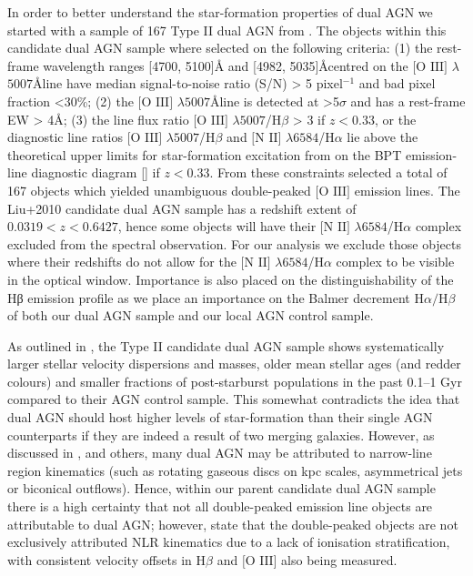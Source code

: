 In order to better understand the star-formation properties of dual AGN we started with a sample of 167 Type II dual AGN from \cite{Liu_2009}. The objects within this candidate dual AGN sample where selected on the following criteria: (1) the rest-frame wavelength ranges [4700, 5100]\AA{} and [4982, 5035]\AA centred on the $\text{[O III]}$ $\lambda$$5007$\AA line have median signal-to-noise ratio (S/N) > 5 pixel$^{−1}$ and bad pixel fraction <30\%; (2) the $\text{[O III]}$ $\lambda$$5007$\AA line is detected at >5$\sigma$ and has a rest-frame EW > 4\AA; (3) the line flux ratio $\text{[O III]}$ $\lambda$$5007$/$\text{H}\beta$ > 3 if ${z}<{0.33}$, or the diagnostic line ratios $\text{[O III]}$ $\lambda$$5007$/$\text{H}\beta$ and $\text{[N II]}$ $\lambda$$6584$/$\text{H}\alpha$ lie above the theoretical upper limits for star-formation excitation from \cite{Kewley_Dopita_Sutherland_Heisler_Trevena_2001} on the BPT emission-line diagnostic diagram [\cite{Baldwin_1981}] if ${z}<{0.33}$. From these constraints \cite{Liu_2009} selected a total of 167 objects which yielded unambiguous double-peaked $\text{[O III]}$ emission lines. The Liu+2010 candidate dual AGN sample has a redshift extent of ${0.0319}<{z}<{0.6427}$, hence some objects will have their $\text{[N II]}$ $\lambda$$6584$/$\text{H}\alpha$ complex excluded from the spectral observation. For our analysis we exclude those objects where their redshifts do not allow for the $\text{[N II]}$ $\lambda$$6584$/$\text{H}\alpha$ complex to be visible in the optical window. Importance is also placed on the distinguishability of the Hβ emission profile as we place an importance on the Balmer decrement $\text{H}\alpha/\text{H}\beta$ of both our dual AGN sample and our local AGN control sample.


As outlined in \cite{Liu_2009}, the Type II candidate dual AGN sample shows systematically larger stellar velocity dispersions and masses, older mean stellar ages (and redder colours) and smaller fractions of post-starburst populations in the past 0.1–1 Gyr compared to their AGN control sample. This somewhat contradicts the idea that dual AGN should host higher levels of star-formation than their single AGN counterparts if they are indeed a result of two merging galaxies. However, as discussed in \cite{Liu_2009}, and others, many dual AGN may be attributed to narrow-line region kinematics (such as rotating gaseous discs on kpc scales, asymmetrical jets or biconical outflows). Hence, within our parent candidate dual AGN sample there is a high certainty that not all double-peaked emission line objects are attributable to dual AGN; however, \cite{Liu_2009}state that the double-peaked objects are not exclusively attributed NLR kinematics due to a lack of ionisation stratification, with consistent velocity offsets in $\text{H}\beta$ and $\text{[O III]}$ also being measured.

